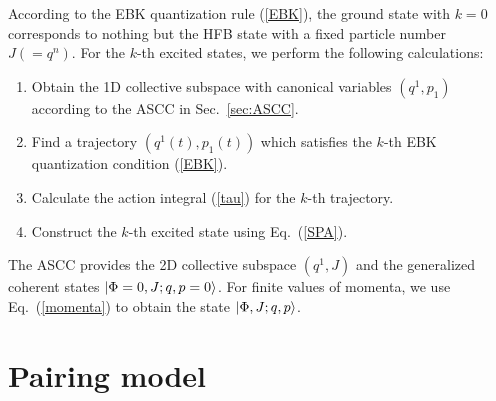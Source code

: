 \documentclass[%
superscriptaddress,
showpacs,
nofootinbib,
amsmath,amssymb,
aps,
prc,
twocolumn,
floatfix ]%
{revtex4-1}
\begin{document}
According to the EBK quantization rule (\ref{EBK}),
the ground state with $k=0$ corresponds to nothing but the HFB state
with a fixed particle number $J(=q^n)$.
For the $k$-th excited states, we perform the following calculations:
\begin{enumerate}
\item Obtain the 1D collective subspace with canonical variables $(q^1,p_1)$
	according to the ASCC in Sec.~\ref{sec:ASCC}.
\item Find a trajectory $(q^1(t),p_1(t))$ which satisfies
the $k$-th EBK quantization condition (\ref{EBK}).
\item Calculate the action integral (\ref{tau}) for the $k$-th trajectory.
\item Construct the $k$-th excited state using Eq.~(\ref{SPA}).
\end{enumerate}
The ASCC provides the 2D collective subspace $(q^1,J)$
and the generalized coherent states $\ket{\Phi=0,J;q,p=0}$.
For finite values of momenta, we use Eq.~(\ref{momenta})
to obtain the state $\ket{\Phi,J;q,p}$.


\section{Pairing model}
\label{sec3}
\end{document}
